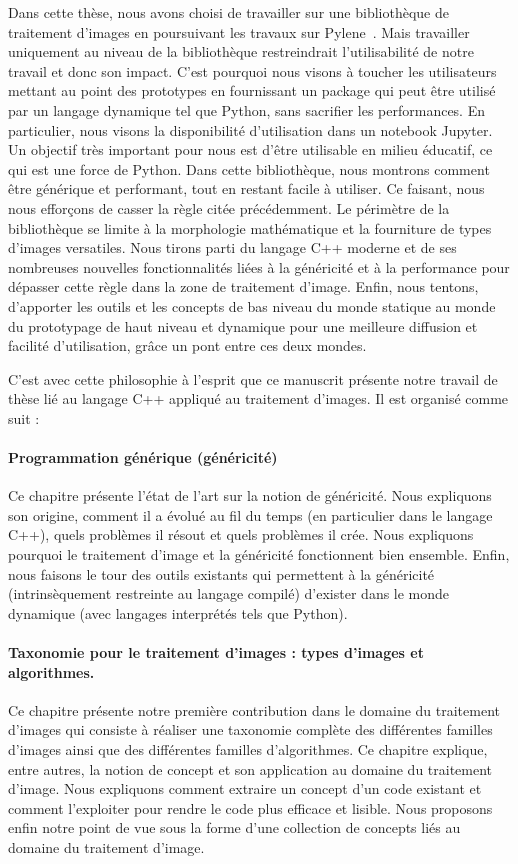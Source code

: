 Dans cette thèse, nous avons choisi de travailler sur une bibliothèque de traitement d'images en poursuivant les travaux
sur Pylene~\parencite{carlinet.2018.pylena}. Mais travailler uniquement au niveau de la bibliothèque restreindrait
l'utilisabilité de notre travail et donc son impact. C'est pourquoi nous visons à toucher les utilisateurs mettant au
point des prototypes en fournissant un package qui peut être utilisé par un langage dynamique tel que Python, sans
sacrifier les performances. En particulier, nous visons la disponibilité d'utilisation dans un notebook Jupyter. Un
objectif très important pour nous est d'être utilisable en milieu éducatif, ce qui est une force de Python. Dans cette
bibliothèque, nous montrons comment être générique et performant, tout en restant facile à utiliser. Ce faisant, nous
nous efforçons de casser la règle citée précédemment. Le périmètre de la bibliothèque se limite à la morphologie
mathématique et la fourniture de types d'images versatiles. Nous tirons parti du langage C++ moderne et de ses
nombreuses nouvelles fonctionnalités liées à la généricité et à la performance pour dépasser cette règle dans la zone de
traitement d'image. Enfin, nous tentons, d'apporter les outils et les concepts de bas niveau du monde statique au monde
du prototypage de haut niveau et dynamique pour une meilleure diffusion et facilité d'utilisation, grâce un pont entre
ces deux mondes.

C'est avec cette philosophie à l'esprit que ce manuscrit présente notre travail de thèse lié au langage C++ appliqué au
traitement d'images. Il est organisé comme suit :

\paragraph{Programmation générique (généricité)} Ce chapitre présente l'état de l'art sur la notion de généricité. Nous
expliquons son origine, comment il a évolué au fil du temps (en particulier dans le langage C++), quels problèmes il
résout et quels problèmes il crée. Nous expliquons pourquoi le traitement d'image et la généricité fonctionnent bien
ensemble. Enfin, nous faisons le tour des outils existants qui permettent à la généricité (intrinsèquement restreinte au
langage compilé) d'exister dans le monde dynamique (avec langages interprétés tels que Python).

\paragraph{Taxonomie pour le traitement d'images : types d'images et algorithmes.} Ce chapitre présente notre première
contribution dans le domaine du traitement d'images qui consiste à réaliser une taxonomie complète des différentes
familles d'images ainsi que des différentes familles d'algorithmes. Ce chapitre explique, entre autres, la notion de
concept et son application au domaine du traitement d'image. Nous expliquons comment extraire un concept d'un code
existant et comment l'exploiter pour rendre le code plus efficace et lisible. Nous proposons enfin notre point de vue
sous la forme d'une collection de concepts liés au domaine du traitement d'image.

